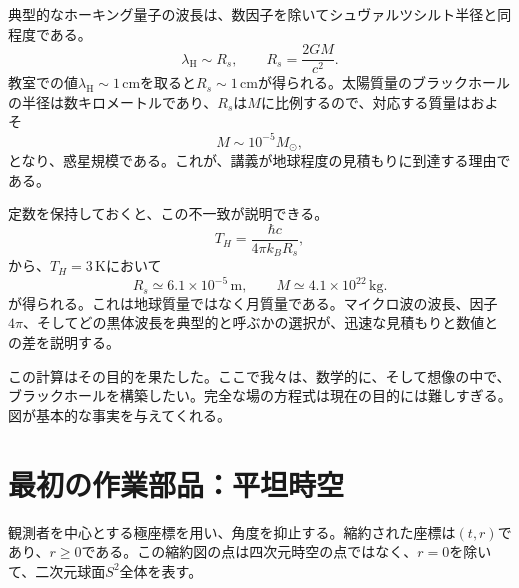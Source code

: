 典型的なホーキング量子の波長は、数因子を除いてシュヴァルツシルト半径と同程度である。
\begin{equation}
\lambda_{\mathrm{H}}\sim R_s,
\qquad
R_s=\frac{2GM}{c^2}.
\label{eq:l05-scale}
\end{equation}
教室での値\(\lambda_{\mathrm H}\sim1\,\mathrm{cm}\)を取ると\(R_s\sim1\,\mathrm{cm}\)が得られる。太陽質量のブラックホールの半径は数キロメートルであり、\(R_s\)は\(M\)に比例するので、対応する質量はおよそ
\begin{equation}
M\sim10^{-5}M_\odot,
\label{eq:l05-rough-mass}
\end{equation}
となり、惑星規模である。これが、講義が地球程度の見積もりに到達する理由である。

\begin{classroomqa}
\end{classroomqa}

定数を保持しておくと、この不一致が説明できる。
\begin{equation}
T_H=\frac{\hbar c}{4\pi k_B R_s},
\end{equation}
から、\(T_H=3\,\mathrm{K}\)において
\begin{equation}
R_s\simeq6.1\times10^{-5}\,\mathrm{m},
\qquad
M\simeq4.1\times10^{22}\,\mathrm{kg}.
\label{eq:l05-three-kelvin}
\end{equation}
が得られる。これは地球質量ではなく月質量である。マイクロ波の波長、因子\(4\pi\)、そしてどの黒体波長を典型的と呼ぶかの選択が、迅速な見積もりと数値との差を説明する。

この計算はその目的を果たした。ここで我々は、数学的に、そして想像の中で、ブラックホールを構築したい。完全な場の方程式は現在の目的には難しすぎる。図が基本的な事実を与えてくれる。

\section{最初の作業部品：平坦時空}

観測者を中心とする極座標を用い、角度を抑止する。縮約された座標は\((t,r)\)であり、\(r\geq0\)である。この縮約図の点は四次元時空の点ではなく、\(r=0\)を除いて、二次元球面\(S^2\)全体を表す。

